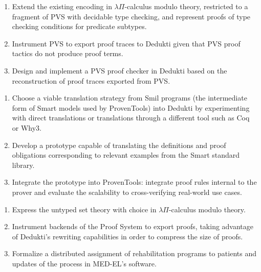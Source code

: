 \begin{workpackage}
\begin{tasklist}
\begin{task}[id=pvs,
  title=Express the theory of PVS in Dedukti,
  lead=Inr,   %
  InrRM=40,  %
  ]
  \begin{enumerate}
  \item Extend the existing encoding in $\lambda\Pi$-calculus modulo theory,
    restricted to a fragment of PVS with decidable type checking, and represent
    proofs of type checking conditions for predicate subtypes.
  \item Instrument PVS to export proof traces to Dedukti given that PVS proof
    tactics do not produce proof terms.
  \item Design and implement a PVS proof checker in Dedukti based on the
    reconstruction of proof traces exported from PVS.
  \end{enumerate}
\end{task}

\begin{task}[id=smart,
  title=Express \textsf{Smart} models and proofs in Dedukti,
  lead=Pro,   %
  ProRM=11,
  ]
  \begin{enumerate}
  \item Choose a viable translation strategy from \textsf{Smil} programs (the
    intermediate form of \textsf{Smart} models used by ProvenTools) into Dedukti
    by experimenting with direct translations or translations through a
    different tool such as Coq or Why3.
  \item Develop a prototype capable of translating the definitions and proof
    obligations corresponding to relevant examples from the \textsf{Smart}
    standard library.
  \item Integrate the prototype into ProvenTools: integrate proof rules internal
    to the prover and evaluate the scalability to cross-verifying real-world use
    cases.
  \end{enumerate}
\end{task}

\begin{task}[id=tla,
  title=Express the theory of \tlaplus in Dedukti,
  lead=Inr,   %
  InrRM=22,   %
  MedRM=3,
  ]
  \begin{enumerate}
  \item Express the untyped \tlaplus set theory with choice in
    $\lambda\Pi$-calculus modulo theory.
  \item Instrument backends of the \tlaplus Proof System to export proofs,
    taking advantage of Dedukti's rewriting capabilities in order to compress
    the size of proofs.
  \item Formalize a distributed assignment of rehabilitation programs to
    patients and updates of the process in MED-EL's software.
  \end{enumerate}
\end{task}


\end{tasklist}
\end{workpackage}
